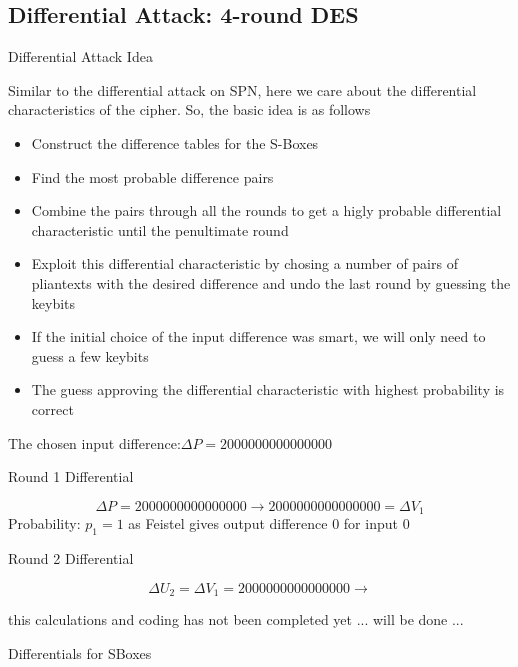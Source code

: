 \documentclass[9pt]{beamer}
\begin{document}
\subsection{Differential Attack: 4-round DES}
\begin{frame}
Differential Attack Idea

Similar to the differential attack on SPN, here we care about the differential characteristics of the cipher. So, the basic idea is as follows

\begin{itemize}
\item{Construct the difference tables for the S-Boxes}
\item{Find the most probable difference pairs}
\item{Combine the pairs through all the rounds to get a higly probable differential characteristic until the penultimate round}
\item{Exploit this differential characteristic by chosing a number of pairs of pliantexts with the desired difference and undo the last round by guessing the keybits}
\item{If the initial choice of the input difference was smart, we will only need to guess a few keybits}
\item{The guess approving the differential characteristic with highest probability is correct}
\end{itemize}

\end{frame}

\begin{frame}
The chosen input difference:$\Delta P = 20 00 00 00 00 00 00 00$

Round 1 Differential

\[ \Delta P = 20 00 00 00 00 00 00 00 \rightarrow 20 00 00 00 00 00 00 00 = \Delta V_1 \]
Probability: $p_1 = 1$ as Feistel gives output difference $0$ for input $0$

Round 2 Differential

\[ \Delta U_2 = \Delta V_1 = 20 00 00 00 00 00 00 00 \rightarrow \]

this calculations and coding has not been completed yet ... will be done ...
\end{frame}

\begin{frame}
Differentials for SBoxes



\end{frame}
\end{document}
